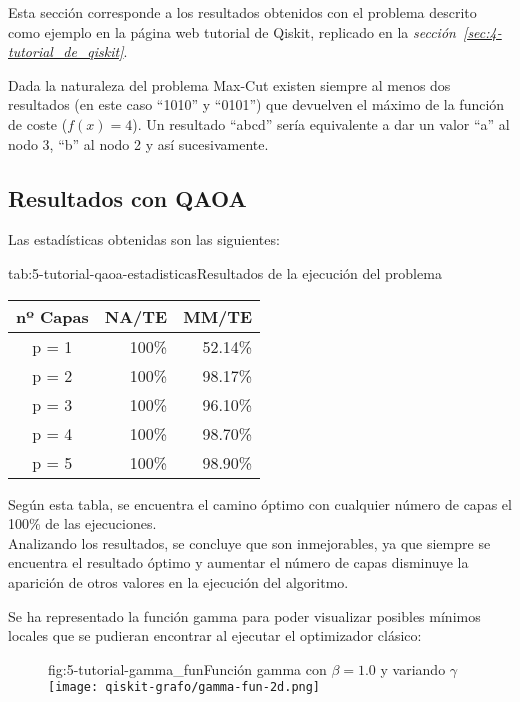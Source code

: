 Esta sección corresponde a los resultados obtenidos con el problema descrito como ejemplo en la página web tutorial de Qiskit\cite{qiskit_tutorial_antiguo}, replicado en la \textit{sección~\ref{sec:4-tutorial_de_qiskit}}.

Dada la naturaleza del problema Max-Cut existen siempre al menos dos resultados (en este caso ``1010'' y ``0101'') que devuelven el máximo de la función de coste (\(f(x) = 4\)).
Un resultado ``abcd'' sería equivalente a dar un valor ``a'' al nodo 3, ``b'' al nodo 2 y así sucesivamente.

\subsection{Resultados con QAOA}

Las estadísticas obtenidas son las siguientes:

\begin{table}[Resultados QAOA {--} max-cut en grafo de 4 aristas]{tab:5-tutorial-qaoa-estadisticas}{Resultados de la ejecución del problema~\cite{qiskit_tutorial_antiguo}}
  \begin{tabular}{|c|r|r|}
    \hline
    \textbf{nº Capas} & \textbf{NA/TE} & \textbf{MM/TE} \\ \hline
    p = 1 & 100\% & 52.14\% \\ \hline
    p = 2 & 100\% & 98.17\% \\ \hline
    p = 3 & 100\% & 96.10\% \\ \hline
    p = 4 & 100\% & 98.70\% \\ \hline
    p = 5 & 100\% & 98.90\% \\ \hline
  \end{tabular}
\end{table}

Según esta tabla, se encuentra el camino óptimo con cualquier número de capas el 100\% de las ejecuciones.
\\
Analizando los resultados, se concluye que son inmejorables, ya que siempre se encuentra el resultado óptimo y aumentar el número de capas disminuye la aparición de otros valores en la ejecución del algoritmo.

Se ha representado la función gamma para poder visualizar posibles mínimos locales que se pudieran encontrar al ejecutar el optimizador clásico:

\begin{figure}[Función gamma {--} max-cut en grafo de 4 aristas]{fig:5-tutorial-gamma_fun}{Función gamma con \(\beta = 1.0\) y variando \(\gamma\)}
  \texttt{[image: qiskit-grafo/gamma-fun-2d.png]}
\end{figure}

